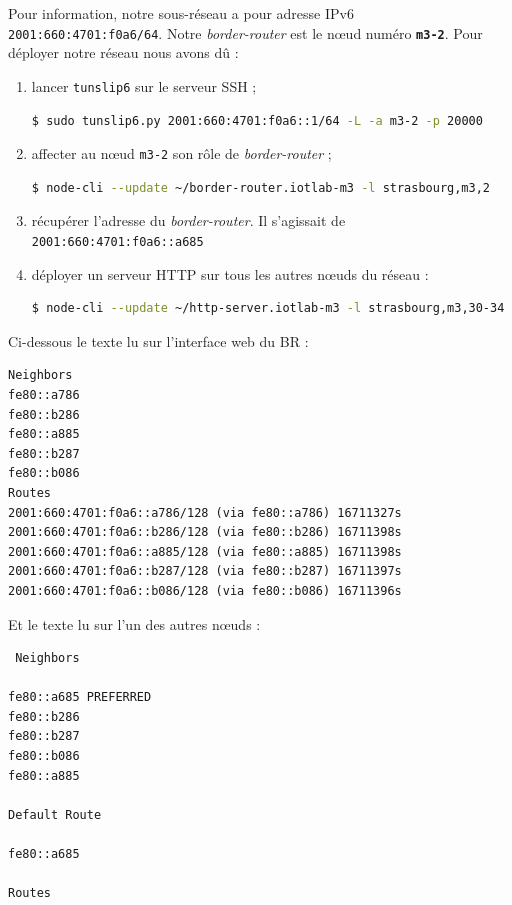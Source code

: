 \documentclass[	DIV=calc,%
							paper=a4,%
							fontsize=11pt,%
			  ]{scrartcl}	 					%
\begin{document}

Pour information, notre sous-réseau a pour adresse IPv6 \texttt{2001:660:4701:f0a6/64}. Notre \textit{border-router} est le nœud numéro \textbf{\texttt{m3-2}}. Pour déployer notre réseau nous avons dû :
\begin{enumerate}
\item lancer \texttt{tunslip6} sur le serveur SSH ;
\begin{lstlisting}[language=bash]
$ sudo tunslip6.py 2001:660:4701:f0a6::1/64 -L -a m3-2 -p 20000
\end{lstlisting}
\item affecter au nœud \texttt{m3-2} son rôle de \textit{border-router} ;
\begin{lstlisting}[language=bash]
$ node-cli --update ~/border-router.iotlab-m3 -l strasbourg,m3,2
\end{lstlisting}
\item récupérer l'adresse du \textit{border-router}. Il s'agissait de \texttt{2001:660:4701:f0a6::a685}
\item déployer un serveur HTTP sur tous les autres nœuds du réseau :
\begin{lstlisting}[language=bash]
$ node-cli --update ~/http-server.iotlab-m3 -l strasbourg,m3,30-34
\end{lstlisting}
\end{enumerate}

Ci-dessous le texte lu sur l'interface web du BR :

\begin{lstlisting}
Neighbors
fe80::a786
fe80::b286
fe80::a885
fe80::b287
fe80::b086
Routes
2001:660:4701:f0a6::a786/128 (via fe80::a786) 16711327s
2001:660:4701:f0a6::b286/128 (via fe80::b286) 16711398s
2001:660:4701:f0a6::a885/128 (via fe80::a885) 16711398s
2001:660:4701:f0a6::b287/128 (via fe80::b287) 16711397s
2001:660:4701:f0a6::b086/128 (via fe80::b086) 16711396s
\end{lstlisting}

Et le texte lu sur l'un des autres nœuds :

\begin{lstlisting}
 Neighbors

fe80::a685 PREFERRED
fe80::b286
fe80::b287
fe80::b086
fe80::a885

Default Route

fe80::a685

Routes
\end{lstlisting}
\end{document}
